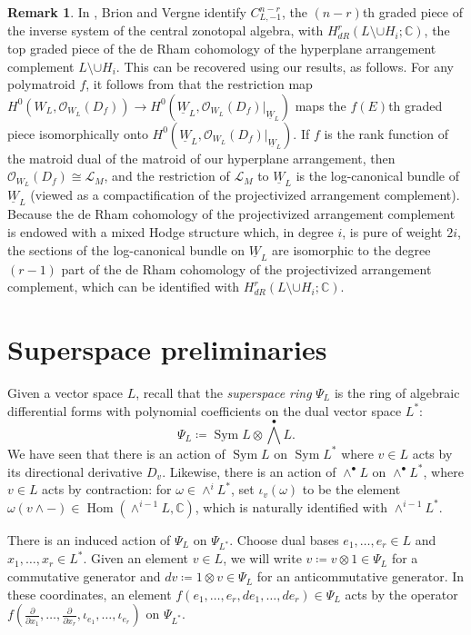 \documentclass{amsart}
\newcommand{\Sym}{\operatorname{Sym}}
\newcommand{\F}{\mathbb{C}}
\newcommand{\Hom}{\operatorname{Hom}}
\theoremstyle{definition}
\newtheorem{remark}[theorem]{Remark}
\begin{document}
\begin{remark}\label{rem:BV}
In \cite{BrionVerge}, Brion and Vergne identify $C_{L, -1}^{n-r}$, the $(n-r)$th graded piece of the inverse system of the central zonotopal algebra, with $H^{r}_{dR}(L \setminus \cup H_i; \F)$, the top graded piece of the de Rham cohomology of the hyperplane arrangement complement $L \setminus \cup H_i$. This can be recovered using our results, as follows. For any polymatroid $f$, it follows from \cite[Theorem A]{EFL} that the restriction map $H^0(W_L, \mathcal{O}_{W_L}(D_f)) \to H^0(\underline{W}_L, \mathcal{O}_{W_L}(D_f)|_{\underline{W}_L})$ maps the $f(E)$th graded piece isomorphically onto $H^0(\underline{W}_L, \mathcal{O}_{W_L}(D_f)|_{\underline{W}_L})$. If $f$ is the rank function of the matroid dual of the matroid of our hyperplane arrangement, then $\mathcal{O}_{W_L}(D_f) \cong \mathcal{L}_M$, and the restriction of $\mathcal{L}_M$ to $\underline{W}_L$ is the log-canonical bundle of $\underline{W}_L$ (viewed as a compactification of the projectivized arrangement complement). Because the de Rham cohomology of the projectivized arrangement complement is endowed with a mixed Hodge structure which, in degree $i$, is pure of weight $2i$, the sections of the log-canonical bundle on $\underline{W}_L$ are isomorphic to the degree $(r-1)$ part of the de Rham cohomology of the projectivized arrangement complement, which can be identified with $H^{r}_{dR}(L \setminus \cup H_i; \F)$. 
\end{remark}



\section{Superspace preliminaries}\label{sec:superspace}
Given a vector space $L$, recall that the \emph{superspace ring} 
$\Psi_{L}$ is the ring of algebraic differential forms with polynomial 
coefficients on the dual vector space $L^*$:
\[
    \Psi_L \coloneqq \Sym L \otimes \bigwedge^\bullet L.
\]
We have seen that there is an action of $\Sym L$ on $\Sym L^*$ where $v 
\in L$ acts by its directional derivative $D_v$. Likewise, there is an 
action of $\wedge^\bullet L$ on $\wedge^\bullet L^*$, where $v \in 
L$ acts by contraction: for $\omega \in \wedge^i L^*$, set $\iota_{v}(\omega)$ to be the element $\omega(v \wedge -) \in \Hom(\wedge^{i-1} L, \F)$, which is naturally identified with $\wedge^{i-1} L^*$. 


There is an induced action of $\Psi_L$ on $\Psi_{L^*}$.
Choose dual bases $e_1, \ldots, e_r \in L$ and $x_1, \ldots, x_r \in 
L^*$. Given an element $v \in L$, we will write $v \coloneqq v \otimes 1 \in 
\Psi_L$ for a commutative generator and $dv \coloneqq 1 \otimes v \in 
\Psi_L$ for an anticommutative generator.
In these coordinates, an element $f(e_1, \ldots, e_r, de_1, \ldots, de_r) 
\in \Psi_L$ acts by the operator $f(\frac{\partial}{\partial x_1}, 
\ldots, \frac{\partial}{\partial x_r}, \iota_{e_1}, \ldots, 
\iota_{e_r})$ on $\Psi_{L^*}$. 
\end{document}
